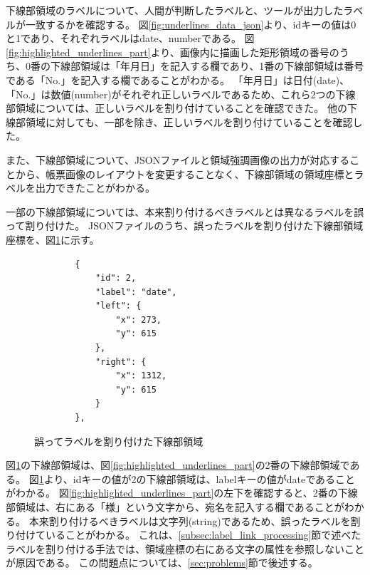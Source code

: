 下線部領域のラベルについて、人間が判断したラベルと、ツールが出力したラベルが一致するかを確認する。
図\ref{fig:underlines_data_json}より、idキーの値は0と1であり、それぞれラベルはdate、numberである。
図\ref{fig:highlighted_underlines_part}より、画像内に描画した矩形領域の番号のうち、0番の下線部領域は「年月日」を記入する欄であり、1番の下線部領域は番号である「No.」を記入する欄であることがわかる。
「年月日」は日付(date)、「No.」は数値(number)がそれぞれ正しいラベルであるため、これら2つの下線部領域については、正しいラベルを割り付けていることを確認できた。
他の下線部領域に対しても、一部を除き、正しいラベルを割り付けていることを確認した。

また、下線部領域について、JSONファイルと領域強調画像の出力が対応することから、帳票画像のレイアウトを変更することなく、下線部領域の領域座標とラベルを出力できたことがわかる。

一部の下線部領域については、本来割り付けるべきラベルとは異なるラベルを誤って割り付けた。
JSONファイルのうち、誤ったラベルを割り付けた下線部領域座標を、図\ref{fig:underlines_data_miss_json}に示す。

\lstset{language=}
\begin{figure}[tp]
    \begin{lstlisting}
        {
            "id": 2,
            "label": "date",
            "left": {
                "x": 273,
                "y": 615
            },
            "right": {
                "x": 1312,
                "y": 615
            }
        },
    \end{lstlisting}
    \caption{誤ってラベルを割り付けた下線部領域}\label{fig:underlines_data_miss_json}
\end{figure}

図\ref{fig:underlines_data_miss_json}の下線部領域は、図\ref{fig:highlighted_underlines_part}の2番の下線部領域である。
図\ref{fig:underlines_data_miss_json}より、idキーの値が2の下線部領域は、labelキーの値がdateであることがわかる。
図\ref{fig:highlighted_underlines_part}の左下を確認すると、2番の下線部領域は、右にある「様」という文字から、宛名を記入する欄であることがわかる。
本来割り付けるべきラベルは文字列(string)であるため、誤ったラベルを割り付けていることがわかる。
これは、\ref{subsec:label_link_processing}節で述べたラベルを割り付ける手法では、領域座標の右にある文字の属性を参照しないことが原因である。
この問題点については、\ref{sec:problems}節で後述する。